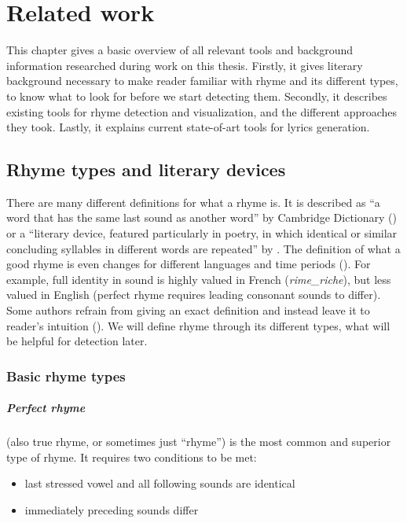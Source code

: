 \listofchanges
\chapter{Related work}\label{chap-related-work}
This chapter gives a basic overview of all relevant tools and background information researched during work on this thesis. Firstly, it gives literary background necessary to make  reader familiar with rhyme and its different types, to know what to look for before we start detecting them. Secondly, it describes existing tools for rhyme detection and visualization, and the different approaches they took. Lastly, it explains current state-of-art tools for lyrics generation.


\section{Rhyme types and literary devices}

There are many different definitions for what a rhyme is. It is described as ``a word that has the same last sound as another word'' by Cambridge Dictionary (\cite{walter2008cambridge}) or a ``literary device, featured particularly in poetry, in which identical or similar concluding syllables in different words are repeated'' by \cite{literarydevices2020}. The definition of what a good rhyme is even changes for different languages and time periods (\cite{zhirmunsky2013introduction}). For example, full identity in sound is highly valued in French (\textit{\gls{rime_riche}}), but less valued in English (perfect rhyme requires leading consonant sounds to differ). Some authors refrain from giving an exact definition and instead leave it to reader's intuition (\cite{plechavc2018collocation}). We will define rhyme through its different types, what will be helpful for detection later. 

\subsection{Basic rhyme types}
\paragraph{Perfect rhyme} (also true rhyme, or sometimes just ``rhyme'') is the most common and superior type of rhyme. It requires two conditions to be met:

\begin{itemize}
	\item last stressed vowel and all following sounds are identical
	\item immediately preceding sounds differ
\end{itemize}

